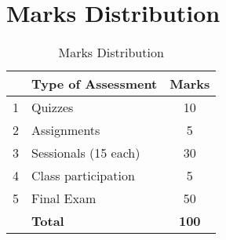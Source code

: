 \documentclass[12pt,a4paper]{article}
\begin{document}
\section{Marks Distribution}
\begin{table}[H]
\begin{center}
\vspace{0.3cm}
	\begin{tabular}{llc}
	\hline \hline
		\rule{0pt}{2.6ex} & \textbf{Type of Assessment} & \textbf{Marks}\\
		\hline
		1 \rule{0pt}{2.6ex} & Quizzes & 10\\
		2 & Assignments& 5\\
		3 & Sessionals (15 each) & 30\\
		4 & Class participation & 5\\
		5 & Final Exam & 50\\
	\hline \hline
	\rule{0pt}{2.6ex} & \textbf{Total} & \textbf{100}\\
	\hline \hline
	\end{tabular}
\end{center}
\label{Marks Distribution}
\caption{Marks Distribution}
\end{table}
\end{document}
